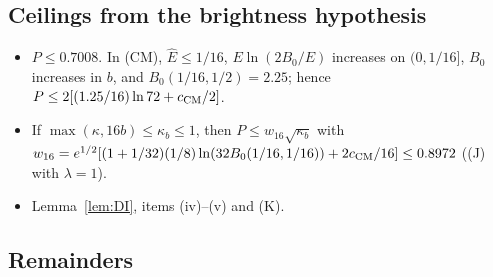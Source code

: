 \subsection{Ceilings from the brightness hypothesis}

\begin{itemize}
\item[(F1)] $P\le0.7008$. In (CM), $\hat E\le1/16$, $E\ln(2B_0/E)$ increases on $(0,1/16]$, $B_0$ increases in $b$, and $B_0(1/16,1/2)=2.25$; hence $P\le2[(1.25/16)\ln72+c_{\rm CM}/2]$.
\item[(F2)] If $\max(\kappa,16b)\le\kappa_b\le1$, then $P\le w_{16}\sqrt{\kappa_b}$ with $w_{16}=e^{1/2}[(1+1/32)(1/8)\ln(32B_0(1/16,1/16))+2c_{\rm CM}/16]\le0.8972$ ((J) with $\lambda=1$).
\item[(F3), (F4)] Lemma~\ref{lem:DI}, items (iv)--(v) and (K).
\end{itemize}

\subsection{Remainders}
\label{sec:R}

